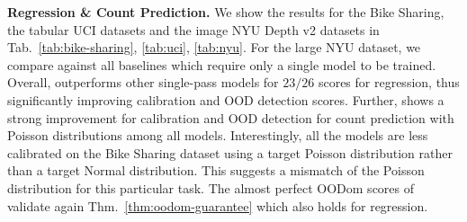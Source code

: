 \textbf{Regression \& Count Prediction.} We show the results for the Bike Sharing, the tabular UCI datasets and the image NYU Depth v2 datasets in Tab.~\ref{tab:bike-sharing}, \ref{tab:uci}, \ref{tab:nyu}. For the large NYU dataset, we compare against all baselines which require only a single model to be trained. Overall, \NatPNacro{} outperforms other single-pass models for $23/26$ scores for regression, thus significantly improving calibration and OOD detection scores. Further, \NatPNacro{} shows a strong improvement for calibration and OOD detection for count prediction with Poisson distributions among all models. Interestingly, all the models are less calibrated on the Bike Sharing dataset using a target Poisson distribution rather than a target Normal distribution. This suggests a mismatch of the Poisson distribution for this particular task. The almost perfect OODom scores of \NatPNacro{} validate again Thm.~\ref{thm:oodom-guarantee} which also holds for regression.

\begin{table}
\vspace{-0mm}
	\centering
    \caption{Batched Inference Time (in ms), NVIDIA GTX 1080 Ti}
\label{tab:inference-time}
\vspace{-0mm}
\vspace{-0mm}
\end{table}

